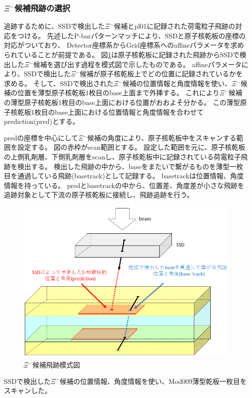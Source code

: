 \documentclass[12pt,a4paper]{jarticle}
\begin{document}
\subsubsection{$\Xi$$^-$候補飛跡の選択}\label{pl01_track}
追跡するために、SSDで検出した$\Xi$$^-$候補とpl01に記録された荷電粒子飛跡の対応をつける。
先述したP-barパターンマッチにより、SSDと原子核乾板の座標の対応がついており、
Detector座標系からGrid座標系へのaffineパラメータを求められていることが前提である。
図\ref{fig:pl01_mosikizu}は原子核乾板に記録された飛跡からSSDで検出した$\Xi$$^-$候補を選び出す過程を模式図で示したものである。
affineパラメータにより、SSDで検出した$\Xi$$^-$候補が原子核乾板上でどの位置に記録されているかを求める。
そして、SSDで検出された$\Xi$$^-$候補の位置情報と角度情報を使い、$\Xi$$^-$候補の位置を薄型原子核乾板1枚目のbase上面まで外挿する。
これにより$\Xi$$^-$候補の薄型原子核乾板1枚目のbase上面における位置がおおよそ分かる。
この薄型原子核乾板1枚目のbase上面における位置情報と角度情報を合わせてprediction(pred)とする。
\par
predの座標を中心にして$\Xi$$^-$候補の角度により、原子核乾板中をスキャンする範囲を設定する。
図の赤枠がscan範囲とする。
設定した範囲を元に、原子核乾板の上側乳剤層、下側乳剤層をscanし、原子核乾板中に記録されている荷電粒子飛跡を検出する。
検出した飛跡の中から、baseをまたいで繋がるものを薄型一枚目を通過している飛跡(basetrack)として記録する。
basetrackは位置情報、角度情報を持っている。
predとbasetrackの中から、位置差、角度差が小さな飛跡を追跡対象として下流の原子核乾板に接続し、飛跡追跡を行う。
\begin{figure}[htbp]
  \centering
     \includegraphics[width=140mm]{pl01_mosikizu.png}
  \caption{$\Xi$$^-$候補飛跡模式図\label{fig:pl01_mosikizu}}
\end{figure}
\newpage
\par
SSDで検出した$\Xi$$^-$候補の位置情報、角度情報を使い、Mod009薄型乾板一枚目をスキャンした。
\end{document}
